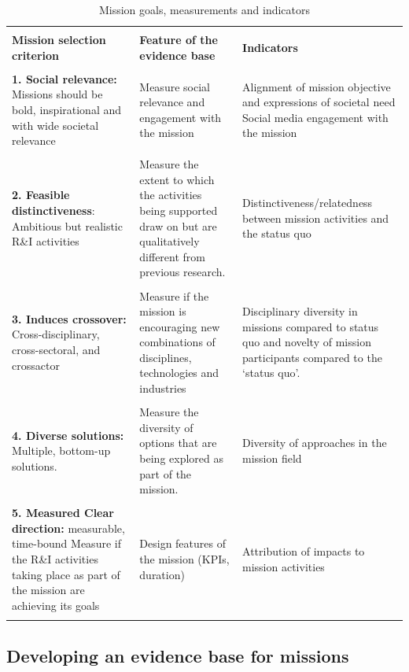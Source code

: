 \documentclass[11pt]{article}
\begin{document}
\begin{table}[!]
\centering
\begin{tabu} to \textwidth {  X[c]  X[c]  X[c]  }
 \\
 \\
 \textbf{Mission selection criterion} & \textbf{Feature of the evidence base} & \textbf{Indicators}
 \\
 \hline
 \\
 \textbf{1. Social relevance:} Missions should be bold, inspirational and with wide societal relevance & 
 Measure social relevance and engagement with the mission   
 & Alignment of mission objective and expressions of societal need Social media engagement with the mission
 \\
 \\
 \textbf{2. Feasible distinctiveness}: Ambitious but realistic R\&I activities
 & Measure the extent to which the activities being supported draw on but are qualitatively different from previous research.
 & Distinctiveness/relatedness between mission activities and the status quo
 \\
 \\
 \textbf{3. Induces crossover:} Cross-disciplinary, cross-sectoral, and crossactor
 & Measure if the mission is encouraging new combinations of disciplines, technologies and industries
 & Disciplinary diversity in missions compared to status quo and novelty of mission participants compared to the `status quo'.
 \\
 \\
 \textbf{4. Diverse solutions:} Multiple, bottom-up solutions.
 & Measure the diversity of options that are being explored as part of the mission.
 & Diversity of approaches in the mission field
 \\
 \\
 \textbf{5. Measured Clear direction:} measurable, time-bound Measure if the R\&I activities taking place as part of the mission are achieving its goals
 & Design features of the mission (KPIs, duration)
 & Attribution of impacts to mission activities
 \\
 \\
 \hline
\end{tabu}
\caption{Mission goals, measurements and indicators}
\end{table}

\subsection{Developing an evidence base for missions}
\label{subsec:evidence}
\end{document}

